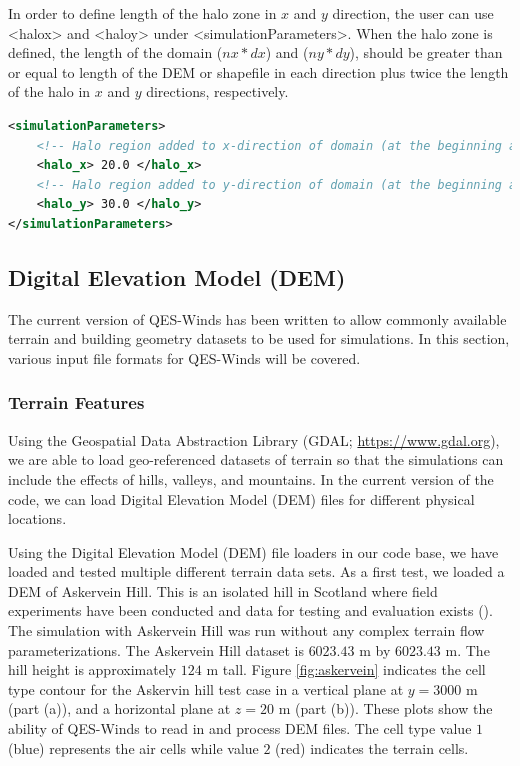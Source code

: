 In order to define length of the halo zone in $x$ and $y$ direction, the user can use <halo\textunderscore x> and <halo\textunderscore y> under <simulationParameters>. When the halo zone is defined, the length of the domain ($nx*dx$) and ($ny*dy$), should be greater than or equal to length of the DEM or shapefile in each direction plus twice the length of the halo in $x$ and $y$ directions, respectively.

\begin{lstlisting}[language=XML]
<simulationParameters>
	<!-- Halo region added to x-direction of domain (at the beginning and the end of domain) (meters)-->
	<halo_x> 20.0 </halo_x>
	<!-- Halo region added to y-direction of domain (at the beginning and the end of domain) (meters)-->
	<halo_y> 30.0 </halo_y>						
</simulationParameters>
\end{lstlisting}


\subsection{Digital Elevation Model (DEM)}

The current version of QES-Winds has been written to allow commonly available terrain and building geometry datasets to be used for simulations. In this section, various input file formats for QES-Winds will be covered.

\subsubsection{Terrain Features}

Using the Geospatial Data Abstraction Library (GDAL; \href{https://www.gdal.org}{https://www.gdal.org}), we are able to load geo-referenced datasets of terrain so that the simulations can include the effects of hills, valleys, and mountains. In the current version of the code, we can load Digital Elevation Model (DEM) files for different physical locations.

Using the Digital Elevation Model (DEM) file loaders in our code base, we have loaded and tested multiple different terrain data sets. As a first test, we loaded a DEM of Askervein Hill. This is an isolated hill in Scotland where field experiments have been conducted and data for testing and evaluation exists (\cite{taylor1987askervein,mickle1988askervein}). The simulation with Askervein Hill was run without any complex terrain flow parameterizations. The Askervein Hill dataset is $6023.43$ m by $6023.43$ m. The hill height is approximately $124$ m tall. Figure \ref{fig:askervein} indicates the cell type contour for the Askervin hill test case in a vertical plane at $y = 3000$ m (part (a)), and a horizontal plane at $z=20$ m (part (b)). These plots show the ability of QES-Winds to read in and process DEM files. The cell type value $1$ (blue) represents the air cells while value $2$ (red) indicates the terrain cells.


